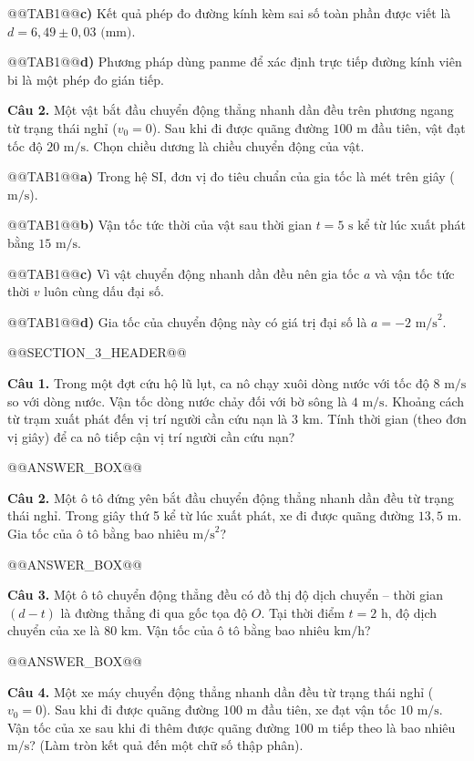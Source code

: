 \documentclass{article}
\begin{document}
@@TAB1@@\textbf{c)} Kết quả phép đo đường kính kèm sai số toàn phần được viết là $d = 6{,}49 \pm 0{,}03\text{ (mm)}$.

@@TAB1@@\textbf{d)} Phương pháp dùng panme để xác định trực tiếp đường kính viên bi là một phép đo gián tiếp.

\textbf{Câu 2.} Một vật bắt đầu chuyển động thẳng nhanh dần đều trên phương ngang từ trạng thái nghỉ ($v_0 = 0$). Sau khi đi được quãng đường $100\text{ m}$ đầu tiên, vật đạt tốc độ $20\text{ m/s}$. Chọn chiều dương là chiều chuyển động của vật.

@@TAB1@@\textbf{a)} Trong hệ SI, đơn vị đo tiêu chuẩn của gia tốc là mét trên giây ($\text{m/s}$).

@@TAB1@@\textbf{b)} Vận tốc tức thời của vật sau thời gian $t = 5\text{ s}$ kể từ lúc xuất phát bằng $15\text{ m/s}$.

@@TAB1@@\textbf{c)} Vì vật chuyển động nhanh dần đều nên gia tốc $a$ và vận tốc tức thời $v$ luôn cùng dấu đại số.

@@TAB1@@\textbf{d)} Gia tốc của chuyển động này có giá trị đại số là $a = -2\text{ m/s}^2$.

@@SECTION_3_HEADER@@

\textbf{Câu 1.} Trong một đợt cứu hộ lũ lụt, ca nô chạy xuôi dòng nước với tốc độ $8\text{ m/s}$ so với dòng nước. Vận tốc dòng nước chảy đối với bờ sông là $4\text{ m/s}$. Khoảng cách từ trạm xuất phát đến vị trí người cần cứu nạn là $3\text{ km}$. Tính thời gian (theo đơn vị giây) để ca nô tiếp cận vị trí người cần cứu nạn?

@@ANSWER_BOX@@

\textbf{Câu 2.} Một ô tô đứng yên bắt đầu chuyển động thẳng nhanh dần đều từ trạng thái nghỉ. Trong giây thứ 5 kể từ lúc xuất phát, xe đi được quãng đường $13{,}5\text{ m}$. Gia tốc của ô tô bằng bao nhiêu $\text{m/s}^2$?

@@ANSWER_BOX@@

\textbf{Câu 3.} Một ô tô chuyển động thẳng đều có đồ thị độ dịch chuyển -- thời gian $(d - t)$ là đường thẳng đi qua gốc tọa độ $O$. Tại thời điểm $t = 2\text{ h}$, độ dịch chuyển của xe là $80\text{ km}$. Vận tốc của ô tô bằng bao nhiêu $\text{km/h}$?

@@ANSWER_BOX@@

\textbf{Câu 4.} Một xe máy chuyển động thẳng nhanh dần đều từ trạng thái nghỉ ($v_0 = 0$). Sau khi đi được quãng đường $100\text{ m}$ đầu tiên, xe đạt vận tốc $10\text{ m/s}$. Vận tốc của xe sau khi đi thêm được quãng đường $100\text{ m}$ tiếp theo là bao nhiêu $\text{m/s}$? (Làm tròn kết quả đến một chữ số thập phân).
\end{document}
